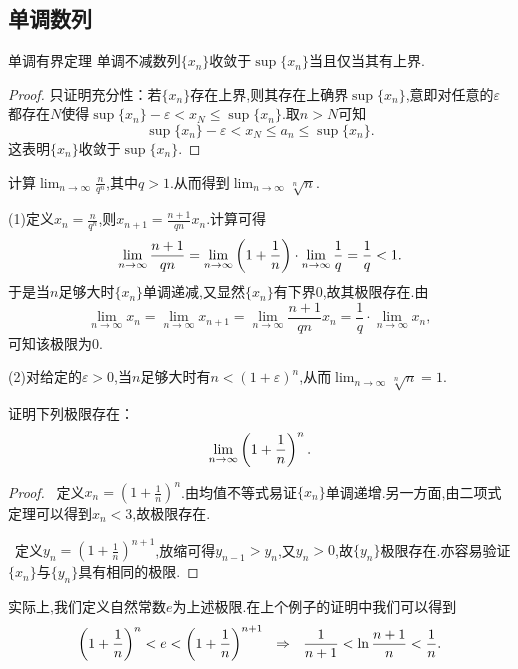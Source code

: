\subsection{单调数列}

\begin{theorem}{单调有界定理}
	单调不减数列$\{ x_n \}$收敛于$\sup \{ x_n \}$当且仅当其有上界.
\end{theorem}
\begin{proof}
	只证明充分性：若$\{ x_n \}$存在上界,则其存在上确界$\sup \{ x_n \}$,意即对任意的$\varepsilon$都存在$N$使得$\sup \{x_n\}-\varepsilon < x_N \leq \sup \{ x_n \}$.取$n>N$可知$$\sup \{x_n\}-\varepsilon < x_N \leq a_n \leq \sup \{ x_n \}.$$
	这表明$\{ x_n \}$收敛于$\sup \{ x_n \}$.
\end{proof}

\begin{example}
	计算$\lim_{n\to \infty} \frac{n}{q^n}$,其中$q>1$.从而得到$\lim_{n\to \infty} \sqrt[n]{n}$.
\end{example}
\begin{solution}
	(1)定义$x_n=\frac{n}{q^n}$,则$x_{n+1}=\frac{n+1}{qn}x_n$.计算可得$$\lim_{n \to \infty} \frac{n+1}{qn} = \lim_{n \to \infty} \left( 1+\frac{1}{n} \right) \cdot \lim_{n \to \infty} \frac{1}{q} = \frac{1}{q} < 1.$$
	于是当$n$足够大时$\{ x_n \}$单调递减,又显然$\{ x_n \}$有下界$0$,故其极限存在.由$$\lim_{n \to \infty} x_{n} = \lim_{n \to \infty} x_{n+1} = \lim_{n \to \infty} \frac{n+1}{qn} x_n = \frac{1}{q} \cdot \lim_{n \to \infty} x_n,$$可知该极限为$0$.
	
	(2)对给定的$\varepsilon > 0$,当$n$足够大时有$n<(1+\varepsilon)^n$,从而$\lim_{n\to \infty} \sqrt[n]{n} =1$.
\end{solution}

\begin{example}
	证明下列极限存在：$$\lim_{n\to \infty} \left( 1+\frac{1}{n} \right)^n.$$
\end{example}
\begin{proof}
	~定义$x_n=(1+\frac{1}{n})^n$.由均值不等式易证$\{ x_n \}$单调递增.另一方面,由二项式定理可以得到$x_n<3$,故极限存在.
	
	~定义$y_n=(1+\frac{1}{n})^{n+1}$,放缩可得$y_{n-1}>y_n$,又$y_n>0$,故$\{ y_n \}$极限存在.亦容易验证$\{ x_n \}$与$\{ y_n \}$具有相同的极限.
\end{proof}

实际上,我们定义自然常数$e$为上述极限.在上个例子的证明中我们可以得到$$\left( 1+\frac{1}{n} \right)^n < e < \left( 1+\frac{1}{n} \right)^{n+1} ~~\Rightarrow ~~ \frac{1}{n+1} < \ln \frac{n+1}{n} < \frac{1}{n}.$$

